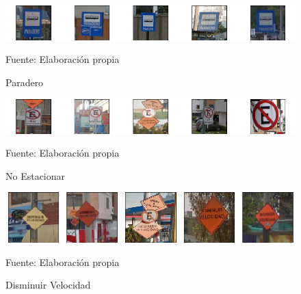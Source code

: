 			\begin{figure}[H]
				\begin{center}
				\includegraphics[width=1\textwidth]{images/desarrollo/imagenes/peru/1__(5).png}
				\end{center}
				\begin{center}
				\caption{\small{Paradero}}
				\vskip -0.25cm
				{\small{Fuente: Elaboración propia}}
				\end{center}
				\vspace{-1.5em}
			\end{figure}

			\begin{figure}[H]
				\begin{center}
				\includegraphics[width=1\textwidth]{images/desarrollo/imagenes/peru/1__(6).png}
				\end{center}
				\begin{center}
				\caption{\small{No Estacionar}}
				\vskip -0.25cm
				{\small{Fuente: Elaboración propia}}
				\end{center}
				\vspace{-1.5em}
			\end{figure}
			
			\begin{figure}[H]
				\begin{center}
				\includegraphics[width=1\textwidth]{images/desarrollo/imagenes/peru/1__(7).png}
				\end{center}
				\begin{center}
				\caption{\small{Disminuir Velocidad}}
				\vskip -0.25cm
				{\small{Fuente: Elaboración propia}}
				\end{center}
				\vspace{-1.5em}
			\end{figure}


